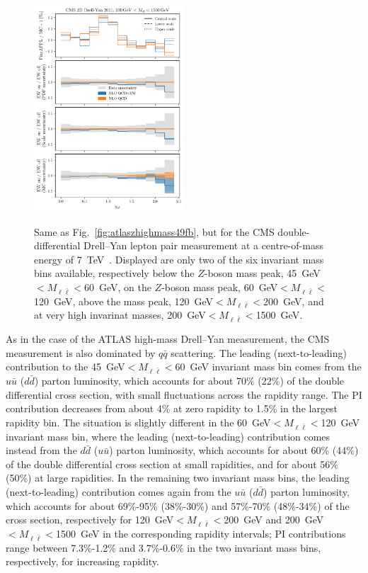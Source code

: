 \begin{figure}[!p]
    \includegraphics[width=0.5\textwidth]{figures/pineappl_CMSDY2D11_bin6}\\
    \caption{Same as Fig.~\ref{fig:atlaszhighmass49fb}, but for the CMS
      double-differential Drell--Yan lepton pair measurement at a
      centre-of-mass energy of 7~TeV~\cite{Chatrchyan:2013tia}. Displayed are
      only two of the six invariant mass bins available, respectively below the
      $Z$-boson mass peak, 45~GeV$<M_{\ell\bar\ell}<$60~GeV, on the $Z$-boson mass
      peak, 60~GeV$<M_{\ell\bar\ell}<$120~GeV, above the mass peak,
      120~GeV$<M_{\ell\bar\ell}<$200~GeV, and at very high invarinat masses,
      200~GeV$<M_{\ell\bar\ell}<$1500~GeV.}
    \label{fig:cmsdy2d11_bins3456}
\end{figure}

As in the case of the ATLAS high-mass Drell--Yan measurement, the CMS
measurement is also dominated by $q\bar{q}$ scattering. The leading
(next-to-leading) contribution to the 45~GeV$<M_{\ell\bar\ell}<$60~GeV invariant
mass bin comes from
the $u\bar{u}$ ($d\bar{d}$) parton luminosity, which accounts for about 70\%
(22\%) of the double differential cross section, with small fluctuations across
the rapidity range. The PI contribution decreases from about 4\% at zero
rapidity to 1.5\% in the largest rapidity bin. The situation is slightly
different in the 60~GeV$<M_{\ell\bar\ell}<$120~GeV invariant mass bin, where the
leading (next-to-leading) contribution comes instead from the $d\bar{d}$
($u\bar{u}$) parton luminosity, which accounts for about 60\% (44\%) of the
double differential cross section at small rapidities, and for about 56\% (50\%)
at large rapidities. In the remaining two invariant mass bins, the leading
(next-to-leading) contribution comes again from the $u\bar{u}$ ($d\bar{d}$)
parton luminosity, which accounts for about 69\%-95\% (38\%-30\%) and
57\%-70\% (48\%-34\%) of the cross section, respectively for
120~GeV$<M_{\ell\bar\ell}<$200~GeV and 200~GeV$<M_{\ell\bar\ell}<$1500~GeV in the
corresponding rapidity intervals; PI contributions range between 7.3\%-1.2\%
and 3.7\%-0.6\% in the two invariant mass bins, respectively, for increasing
rapidity.

